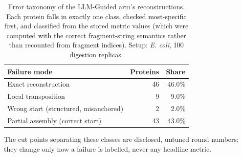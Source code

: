 \begin{table}[!tb]
  \centering
  \caption{Error taxonomy of the LLM-Guided arm's reconstructions. Each protein falls in exactly one class, checked most-specific first, and classified from the stored metric values (which were computed with the correct fragment-string semantics rather than recounted from fragment indices). Setup: \textnormal{\textnormal{\textit{E. coli}}}, 100 digestion replicas.}
  \label{tab:error_taxonomy_ecoli_r100}
  \begin{tabular}{lrr}
    \toprule
    Failure mode & Proteins & Share \\
    \midrule
    Exact reconstruction & 46 & 46.0\% \\
    Local transposition & 9 & 9.0\% \\
    Wrong start (structured, misanchored) & 2 & 2.0\% \\
    Partial assembly (correct start) & 43 & 43.0\% \\
    \bottomrule
  \end{tabular}
  \par\smallskip\footnotesize{The cut points separating these classes are disclosed, untuned round numbers; they change only how a failure is labelled, never any headline metric.}
\end{table}
